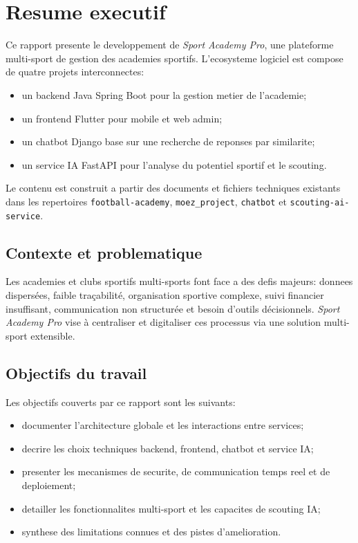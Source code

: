 \chapter{Resume executif}

Ce rapport presente le developpement de \textit{Sport Academy Pro}, une plateforme multi-sport de gestion des academies sportifs. L'ecosysteme logiciel est compose de quatre projets interconnectes:
\begin{itemize}
  \item un backend Java Spring Boot pour la gestion metier de l'academie;
  \item un frontend Flutter pour mobile et web admin;
  \item un chatbot Django base sur une recherche de reponses par similarite;
  \item un service IA FastAPI pour l'analyse du potentiel sportif et le scouting.
\end{itemize}

Le contenu est construit a partir des documents et fichiers techniques existants dans les repertoires \texttt{football-academy}, \texttt{moez\_project}, \texttt{chatbot} et \texttt{scouting-ai-service}.

\section{Contexte et problematique}

Les academies et clubs sportifs multi-sports font face a des defis majeurs: donnees dispersées, faible traçabilité, organisation sportive complexe, suivi financier insuffisant, communication non structurée et besoin d'outils décisionnels. \textit{Sport Academy Pro} vise à centraliser et digitaliser ces processus via une solution multi-sport extensible.

\section{Objectifs du travail}

Les objectifs couverts par ce rapport sont les suivants:
\begin{itemize}
  \item documenter l'architecture globale et les interactions entre services;
  \item decrire les choix techniques backend, frontend, chatbot et service IA;
  \item presenter les mecanismes de securite, de communication temps reel et de deploiement;
  \item detailler les fonctionnalites multi-sport et les capacites de scouting IA;
  \item synthese des limitations connues et des pistes d'amelioration.
\end{itemize}

